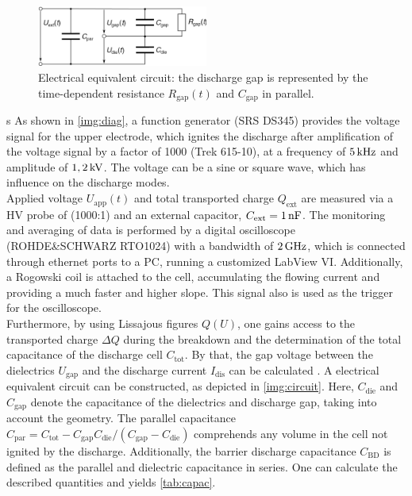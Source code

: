 \documentclass[a4paper,10pt,twoside]{article}
\newcommand{\ix}[1]{_\text{#1}}
\begin{document}
				\begin{figure}
					\centering
					\includegraphics[width=0.5\textwidth]{figures/setup/replacementcircuit.pdf}
					\caption{Electrical equivalent circuit: the discharge gap is represented by the time-dependent resistance $R\ix{gap}(t)$ and $C\ix{gap}$ in parallel.}
					\label{img:circuit}
				\end{figure}
		
					 s
			 As shown in \autoref{img:diag}, a function generator (SRS DS345) provides the voltage signal for the upper electrode, which ignites the discharge after amplification of the voltage signal by a factor of 1000 (Trek 615-10), at a frequency of $\unit[5]{kHz}$ and amplitude of $\unit[1,2]{kV}$. The voltage can be a sine or square wave, which has influence on the discharge modes.\\
			 Applied voltage $U\ix{app}(t)$ and total transported charge $Q\ix{ext}$ are measured via a HV probe of (1000:1) and an external capacitor, $C\ix{ext}=\unit[1]{nF}$. The monitoring and averaging of data is performed by a digital oscilloscope (ROHDE\&SCHWARZ RTO1024) with a bandwidth of $\unit[2]{GHz}$, which is connected through ethernet ports to a PC, running a customized LabView VI. Additionally, a Rogowski coil is attached to the cell, accumulating the flowing current and providing a much faster and higher slope. This signal also is used as the trigger for the oscilloscope.\\
			 Furthermore, by using Lissajous figures $Q(U)$, one gains access to the transported charge $\Delta Q$ during the breakdown and the determination of the total capacitance of the discharge cell $C\ix{tot}$. By that, the gap voltage between the dielectrics $U\ix{gap}$ and the discharge current $I\ix{dis}$ can be calculated \cite{Kogelschatz2003}. A electrical equivalent circuit can be constructed, as depicted in \autoref{img:circuit}. Here, $C\ix{die}$ and $C\ix{gap}$ denote the capacitance of the dielectrics and discharge gap, taking into account the geometry. The parallel capacitance $C\ix{par}=C\ix{tot}-C\ix{gap}C\ix{die}/\left(C\ix{gap}-C\ix{die}\right)$ comprehends any volume in the cell not ignited by the discharge. Additionally, the barrier discharge capacitance $C\ix{BD}$ is defined as the parallel and dielectric capacitance in series. One can calculate the described quantities and yields \autoref{tab:capac}.
			 
\end{document}
